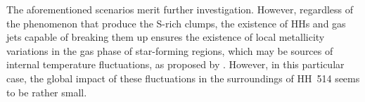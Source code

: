 \documentclass[fleqn,usenatbib]{mnras}
\begin{document}
The aforementioned scenarios merit further investigation. However, regardless of the phenomenon that produce the S-rich clumps, the existence of HHs and gas jets capable of breaking them up ensures the existence of local metallicity variations in the gas phase of star-forming regions, which may be sources of internal temperature fluctuations, as proposed by \citet{Peimbert67}. However, in this particular case, the global impact of these fluctuations in the surroundings of HH~514 seems to be rather small.






\end{document}
